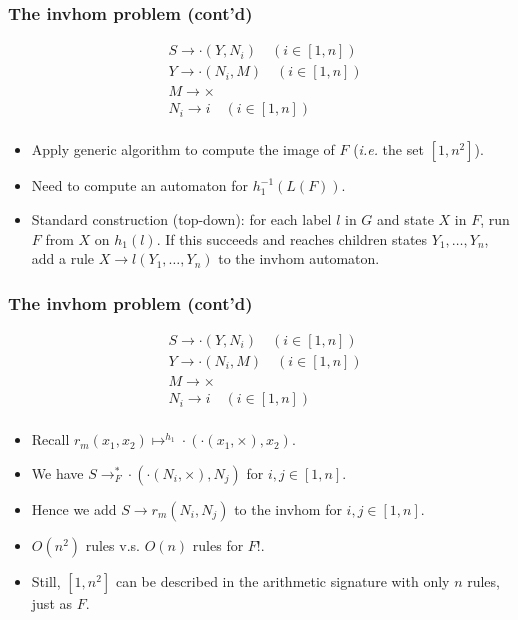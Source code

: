 \documentclass{beamer}
\begin{document}
\begin{frame}
  \frametitle{The invhom problem (cont'd)}
  \[
    \begin{aligned}
      & S \rightarrow \cdot(Y, N_i) \quad (i \in [1,n])\\
      & Y \rightarrow \cdot(N_i, M) \quad (i \in [1,n])\\
      & M \rightarrow \times\\
      & N_i \rightarrow i \quad (i \in [1,n])\\ 
    \end{aligned}    
    \]
    
    \begin{itemize}
    \item Apply generic algorithm to compute the image of $F$ (\emph{i.e.} the set $[1, n^2]$).
    \item Need to compute an automaton for $h_1^{-1}(L(F))$.
    \item Standard construction (top-down): for each label $l$ in $G$ and state $X$ in $F$, run $F$ from $X$ on $h_1(l)$. If this succeeds and reaches children states $Y_1, \dots, Y_n$, add a rule $X \rightarrow l(Y_1, \dots, Y_n)$ to the invhom automaton. 
    \end{itemize}
\end{frame}

\begin{frame}
  \frametitle{The invhom problem (cont'd)}
  \[
  \begin{aligned}
    & S \rightarrow \cdot(Y, N_i) \quad (i \in [1,n])\\
    & Y \rightarrow \cdot(N_i, M) \quad (i \in [1,n])\\
    & M \rightarrow \times\\
    & N_i \rightarrow i \quad (i \in [1,n])\\ 
  \end{aligned}    
  \]

  \begin{itemize}
  \item Recall $r_m(x_1, x_2) \mapsto^{h_1} \cdot(\cdot(x_1, {\times}), x_2)$.
  \item We have $S \rightarrow^{*}_{F} \cdot(\cdot(N_i, {\times}), N_j)$ for $i,j \in [1,n]$.
  \item Hence we add $S \rightarrow r_m(N_i, N_j)$ to the invhom for $i,j \in [1,n]$.
  \item \alert{$O(n^2)$ rules v.s. $O(n)$ rules for $F$!}.
  \item Still, $[1,n^2]$ can be described in the arithmetic signature with only $n$ rules, just as $F$.
  \end{itemize}
    
\end{frame}
\end{document}
